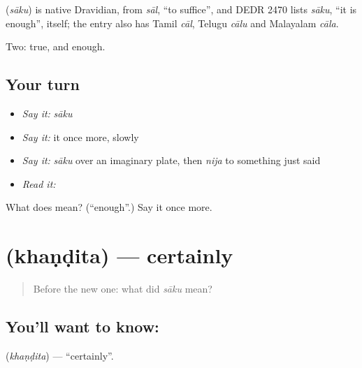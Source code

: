 \begin{cousinweb}
\textbf{} (\emph{sāku}) is native Dravidian, from \emph{sāl}, \textquotedblleft{}to suffice\textquotedblright{}, and DEDR 2470 lists \emph{sāku}, \textquotedblleft{}it is enough\textquotedblright{}, itself; the entry also has Tamil \emph{cāl}, Telugu \emph{cālu} and Malayalam \emph{cāla}.
\end{cousinweb}

\begin{grammarlens}[title={What you've built}]
Two: true, and enough.
\end{grammarlens}

\subsection*{Your turn}
\begin{itemize}
\raggedright
  \item \emph{Say it:} \emph{sāku}
  \item \emph{Say it:} it once more, slowly
  \item \emph{Say it:} \emph{sāku} over an imaginary plate, then \emph{nija} to something just said
  \item \emph{Read it:} \textbf{}
\end{itemize}

\begin{tcolorbox}[breakable,colback=teal!4,colframe=teal!35!black,title={Before you move on}]
What does  mean? (\textquotedblleft{}enough\textquotedblright{}.) Say it once more.
\end{tcolorbox}
\section[\texorpdfstring{\kn{ಖಂಡಿತ} (khaṇḍita)}{ಖಂಡಿತ (khaṇḍita)}]{ (khaṇḍita) — certainly}

\label{lesson:KA-C49-certainly}



\begin{quote}
Before the new one: what did \emph{sāku} mean?
\end{quote}

\subsection*{You'll want to know: }
\textbf{} (\emph{khaṇḍita}) — \textquotedblleft{}certainly\textquotedblright{}.

